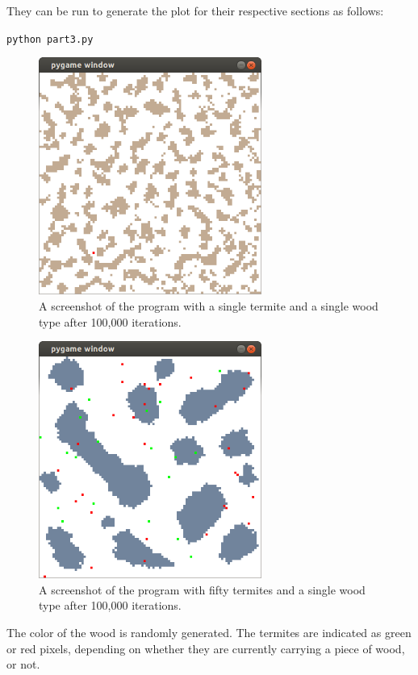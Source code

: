 \documentclass{article}
\begin{document}
\begin{enumerate}
They can be run to generate the plot for their respective sections as follows:

\texttt{python part3.py}

\begin{figure}[H]
\centering
\includegraphics[width=0.65\textwidth]{figs/part_1_1.png}
\caption{A screenshot of the program with a single termite and a single wood
type after 100,000 iterations.}
\end{figure}

\begin{figure}[H]
\centering
\includegraphics[width=0.65\textwidth]{figs/part_1_2.png}
\caption{A screenshot of the program with fifty termites and a single wood type
after 100,000 iterations.}
\end{figure}

The color of the wood is randomly generated. The termites are indicated as green
or red pixels, depending on whether they are currently carrying a piece of wood,
or not.


\end{enumerate}
\end{document}
